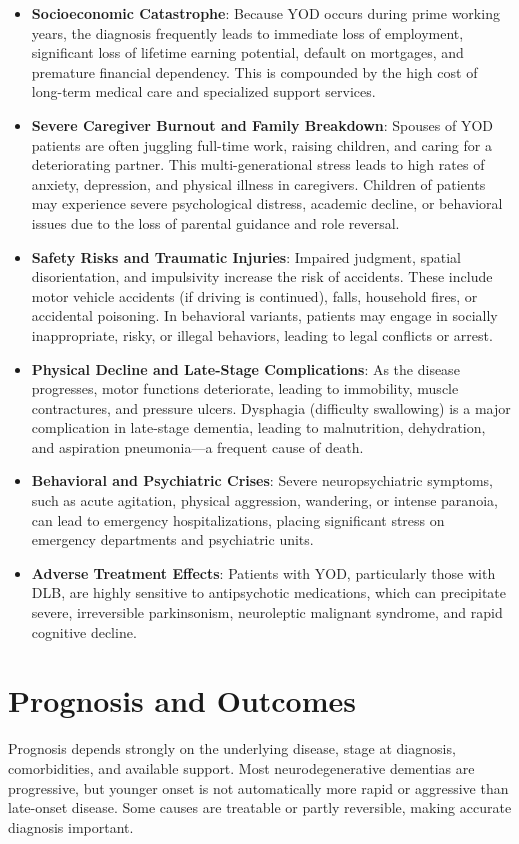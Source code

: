 \begin{itemize}
    \item \textbf{Socioeconomic Catastrophe}: Because YOD occurs during prime working years, the diagnosis frequently leads to immediate loss of employment, significant loss of lifetime earning potential, default on mortgages, and premature financial dependency. This is compounded by the high cost of long-term medical care and specialized support services.
    \item \textbf{Severe Caregiver Burnout and Family Breakdown}: Spouses of YOD patients are often juggling full-time work, raising children, and caring for a deteriorating partner. This multi-generational stress leads to high rates of anxiety, depression, and physical illness in caregivers. Children of patients may experience severe psychological distress, academic decline, or behavioral issues due to the loss of parental guidance and role reversal.
    \item \textbf{Safety Risks and Traumatic Injuries}: Impaired judgment, spatial disorientation, and impulsivity increase the risk of accidents. These include motor vehicle accidents (if driving is continued), falls, household fires, or accidental poisoning. In behavioral variants, patients may engage in socially inappropriate, risky, or illegal behaviors, leading to legal conflicts or arrest.
    \item \textbf{Physical Decline and Late-Stage Complications}: As the disease progresses, motor functions deteriorate, leading to immobility, muscle contractures, and pressure ulcers. Dysphagia (difficulty swallowing) is a major complication in late-stage dementia, leading to malnutrition, dehydration, and aspiration pneumonia---a frequent cause of death.
    \item \textbf{Behavioral and Psychiatric Crises}: Severe neuropsychiatric symptoms, such as acute agitation, physical aggression, wandering, or intense paranoia, can lead to emergency hospitalizations, placing significant stress on emergency departments and psychiatric units.
    \item \textbf{Adverse Treatment Effects}: Patients with YOD, particularly those with DLB, are highly sensitive to antipsychotic medications, which can precipitate severe, irreversible parkinsonism, neuroleptic malignant syndrome, and rapid cognitive decline.
\end{itemize}

\section*{Prognosis and Outcomes}
Prognosis depends strongly on the underlying disease, stage at diagnosis, comorbidities, and available support. Most neurodegenerative dementias are progressive, but younger onset is not automatically more rapid or aggressive than late-onset disease. Some causes are treatable or partly reversible, making accurate diagnosis important.

